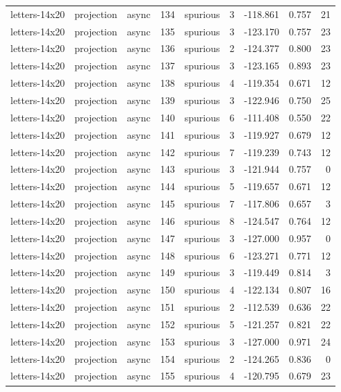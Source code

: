 \begin{tabular}{lllrlrrrr}
letters-14x20 & projection & async & 134 & spurious & 3 & -118.861 & 0.757 & 21 \\
letters-14x20 & projection & async & 135 & spurious & 3 & -123.170 & 0.757 & 23 \\
letters-14x20 & projection & async & 136 & spurious & 2 & -124.377 & 0.800 & 23 \\
letters-14x20 & projection & async & 137 & spurious & 3 & -123.165 & 0.893 & 23 \\
letters-14x20 & projection & async & 138 & spurious & 4 & -119.354 & 0.671 & 12 \\
letters-14x20 & projection & async & 139 & spurious & 3 & -122.946 & 0.750 & 25 \\
letters-14x20 & projection & async & 140 & spurious & 6 & -111.408 & 0.550 & 22 \\
letters-14x20 & projection & async & 141 & spurious & 3 & -119.927 & 0.679 & 12 \\
letters-14x20 & projection & async & 142 & spurious & 7 & -119.239 & 0.743 & 12 \\
letters-14x20 & projection & async & 143 & spurious & 3 & -121.944 & 0.757 & 0 \\
letters-14x20 & projection & async & 144 & spurious & 5 & -119.657 & 0.671 & 12 \\
letters-14x20 & projection & async & 145 & spurious & 7 & -117.806 & 0.657 & 3 \\
letters-14x20 & projection & async & 146 & spurious & 8 & -124.547 & 0.764 & 12 \\
letters-14x20 & projection & async & 147 & spurious & 3 & -127.000 & 0.957 & 0 \\
letters-14x20 & projection & async & 148 & spurious & 6 & -123.271 & 0.771 & 12 \\
letters-14x20 & projection & async & 149 & spurious & 3 & -119.449 & 0.814 & 3 \\
letters-14x20 & projection & async & 150 & spurious & 4 & -122.134 & 0.807 & 16 \\
letters-14x20 & projection & async & 151 & spurious & 2 & -112.539 & 0.636 & 22 \\
letters-14x20 & projection & async & 152 & spurious & 5 & -121.257 & 0.821 & 22 \\
letters-14x20 & projection & async & 153 & spurious & 3 & -127.000 & 0.971 & 24 \\
letters-14x20 & projection & async & 154 & spurious & 2 & -124.265 & 0.836 & 0 \\
letters-14x20 & projection & async & 155 & spurious & 4 & -120.795 & 0.679 & 23 \\

\end{tabular}
